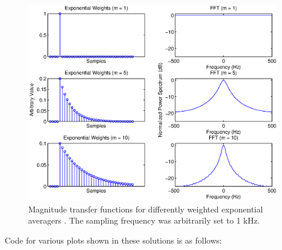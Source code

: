 \begin{figure}[htb!]
\centering
\includegraphics[width=1.0\linewidth]{exp_weight_averager/exp_weight_ave_fft.eps}
\caption{Magnitude transfer functions for differently weighted exponential averagers .  The sampling frequency was arbitrarily set to 1 kHz.}
\label{fig:exp_fft}
\end{figure}

Code for various plots shown in these solutions is as follows:





